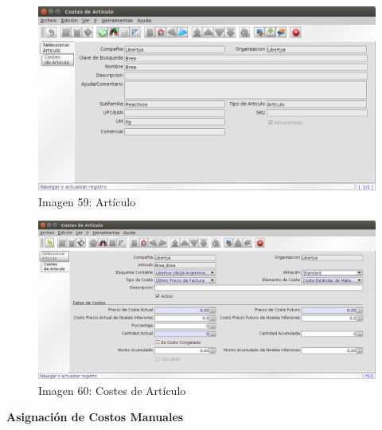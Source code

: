 \documentclass[letterpaper,10pt,spanish]{sphinxmanual}
\begin{document}
\begin{figure}[htbp]
\centering
\capstart

\includegraphics{ly_costeart_1.png}
\caption{Imagen 59: Artículo}\end{figure}
\begin{figure}[htbp]
\centering
\capstart

\includegraphics{ly_costeart_2.png}
\caption{Imagen 60: Costes de Artículo}\end{figure}

\textbf{Asignación de Costos Manuales}
\end{document}
